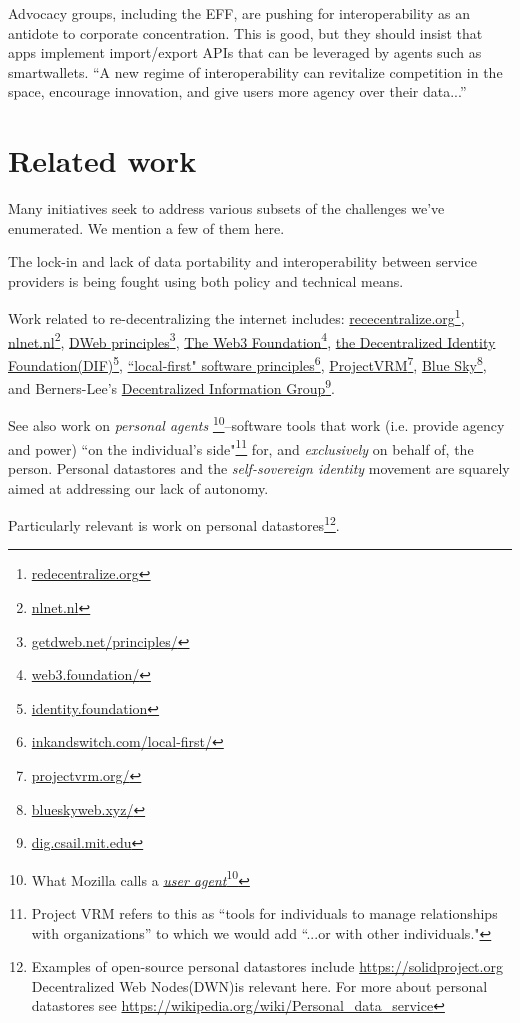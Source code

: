 \documentclass[11pt, oneside]{article}   	%
\newcommand{\hyperfootnote}[1][]{\def\ArgI{{#1}}\hyperfootnoteRelay}
\newcommand\hyperfootnoteRelay[2][]{\href{#1#2}{\ArgI}\footnote{\href{#1#2}{#2}}}
\begin{document}
Advocacy groups, including the EFF, are pushing for interoperability as an antidote to corporate concentration. This is good, but they should insist that apps implement import/export APIs that can be leveraged by agents such as smartwallets. ``A new regime of interoperability can revitalize competition in the space, encourage innovation, and give users more agency over their data...''\cite{Cyphers2021} 

\section{Related work} %

Many initiatives seek to address various subsets of the challenges we've enumerated. We mention a few of them here.

The lock-in and lack of data portability and interoperability between service providers is being fought using both policy and technical means\cite{Doctorow2021}\cite{Cyphers2021}. 

Work related to re-decentralizing the internet includes: \hyperfootnote[rececentralize.org][https://]{redecentralize.org}, \hyperfootnote[nlnet.nl][https://]{nlnet.nl}, \hyperfootnote[DWeb principles][https://]{getdweb.net/principles/}, \hyperfootnote[The Web3 Foundation][https://]{web3.foundation/}, \hyperfootnote[the Decentralized Identity Foundation(DIF)][https://]{identity.foundation}, \hyperfootnote[``local-first" software principles][https://]{inkandswitch.com/local-first/}, \hyperfootnote[ProjectVRM][https://]{projectvrm.org/}, \hyperfootnote[Blue Sky][https://]{blueskyweb.xyz/}, and Berners-Lee's \hyperfootnote[Decentralized Information Group][https://]{dig.csail.mit.edu}. 

See also work on \emph{personal agents} \footnote{What Mozilla calls a \hyperfootnote[\emph{user agent}][https://]{developer.mozilla.org/en-US/docs/Glossary/User\_agent}}--software tools that work (i.e. provide agency and power) ``on the individual's side"\footnote{Project VRM\cite{Searls2019} refers to this as ``tools for individuals to manage relationships with organizations'' to which we would add ``...or with other individuals."} for, and \emph{exclusively} on behalf of, the person. Personal datastores and the \emph{self-sovereign identity}\cite{Preukschat2021} movement are squarely aimed at addressing our lack of autonomy.

Particularly relevant is work on personal datastores\footnote{Examples of open-source personal datastores include \url{https://solidproject.org} Decentralized Web Nodes(DWN)is relevant here. For more about personal datastores see \url{https://wikipedia.org/wiki/Personal\_data\_service}}. 
\end{document}
